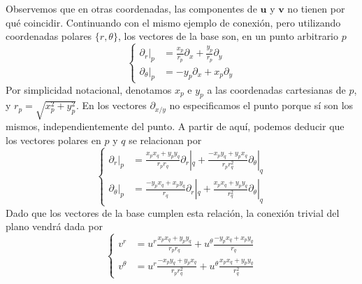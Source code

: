 \begin{example}
    Observemos que en otras coordenadas, las componentes de \(\mathbf{u}\) y \(\mathbf{v}\) no tienen por qué coincidir. Continuando con el mismo ejemplo de conexión, pero utilizando coordenadas polares \(\{r, \theta\}\), los vectores de la base son, en un punto arbitrario \(p\)
    \begin{equation*}
        \left\{\begin{aligned}
            \partial_r|_p &= \frac{x_p}{r_p}\partial_x + \frac{y_p}{r_p}\partial_y\\
            \partial_\theta|_p &= -y_p\partial_x + x_p\partial_y
        \end{aligned}\right.
    \end{equation*}
    Por simplicidad notacional, denotamos \(x_p\) e \(y_p\) a las coordenadas cartesianas de \(p\), y \(r_p = \sqrt{x_p^2 + y_p^2}\). En los vectores \(\partial_{x/y}\) no especificamos el punto porque sí son los mismos, independientemente del punto. A partir de aquí, podemos deducir que los vectores polares en \(p\) y \(q\) se relacionan por
    \begin{equation*}
        \left\{
            \begin{aligned}
                \partial_r|_p &= \frac{x_px_q + y_py_q}{r_pr_q}\partial_r|_q + \frac{-x_py_q + y_px_q}{r_pr_q^2}\partial_\theta|_q\\
                \partial_\theta|_p &= \frac{-y_px_q + x_py_q}{r_q}\partial_r|_q + \frac{x_px_q + y_py_q}{r_q^2}\partial_\theta|_q
            \end{aligned}
        \right.
    \end{equation*}
    Dado que los vectores de la base cumplen esta relación, la conexión trivial del plano vendrá dada por 
    \begin{equation*}
        \left\{
            \begin{aligned}
                v^r &= u^r\frac{x_px_q + y_py_q}{r_pr_q} + u^\theta \frac{-y_px_q + x_py_q}{r_q}\\
                v^\theta &= u^r\frac{-x_py_q + y_px_q}{r_pr_q^2} + u^\theta\frac{x_px_q + y_py_q}{r_q^2}
            \end{aligned}
        \right.
    \end{equation*}
\end{example}

